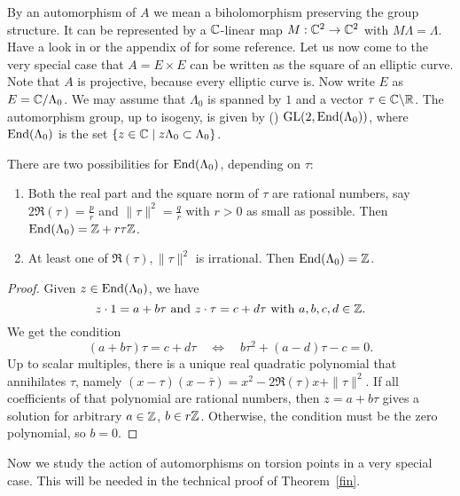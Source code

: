 By an automorphism of $A$ we mean a biholomorphism preserving the group structure. It can be represented by a $\mathbb{C}$-linear map $ M:\mathbb{C}^2 \rightarrow \mathbb{C}^2$ with $M\Lambda =\Lambda$. Have a look in \cite{Fujiki} or the appendix of \cite{Ghys} for some reference.
Let us now come to the very special case that $A=E\times E$ can be written as the square of an elliptic curve. Note that $A$ is projective, because every elliptic curve is. 
Now write $E$ as $E=\mathbb{C}/\Lambda_0$. We may assume that $\Lambda_0 $ is spanned by $1$ and a vector $\tau\in\mathbb{C}\backslash\mathbb{R}$. The automorphism group, up to isogeny, is given by (\cite{Ghys})
$\operatorname{GL}(2,\operatorname{End}(\Lambda_0))$, where
$\operatorname{End}(\Lambda_0)$ is the set $\{z\in\mathbb{C} \;|\; z\Lambda_0\subset \Lambda_0\}$.
\begin{proposition} \label{EndLambda}
There are two possibilities for $\operatorname{End}(\Lambda_0)$, depending on $\tau$:
\begin{enumerate}
 \item Both the real part and the square norm of $\tau$ are rational numbers, say $2\Re(\tau) = \frac{p}{r}$ and $\|\tau\|^2 = \frac{q}{r}$ with $r>0$ as small as possible. Then $\operatorname{End}(\Lambda_0)= \mathbb{Z}+ r\tau\mathbb{Z}$.
 \item At least one of $\Re(\tau), \|\tau\|^2$ is irrational. Then $\operatorname{End}(\Lambda_0)=\mathbb{Z}$.
\end{enumerate}
\end{proposition}
\begin{proof}
Given $z\in\operatorname{End}(\Lambda_0)$, we have $$z\cdot 1 = a + b\tau\text{ and }z\cdot \tau = c+ d\tau\text{ with }a,b,c,d\in \mathbb{Z}.$$ 
We get the condition
$$
(a+b\tau)\tau = c+d\tau\quad \Leftrightarrow \quad b\tau^2 + (a-d)\tau -c =0.
$$
Up to scalar multiples, there is a unique real quadratic polynomial that annihilates $\tau$, namely $ (x -\tau )(x-\bar{\tau})=x^2 - 2\Re(\tau)x+ \|\tau\|^2$. 
If all coefficients of that polynomial are rational numbers, then $z=a+b\tau$ gives a solution for arbitrary $a\in\mathbb{Z}$, $b\in r\mathbb{Z}$. Otherwise, the condition must be the zero polynomial, so $b=0$.
\end{proof}
Now we study the action of automorphisms on torsion points in a very special case. This will be needed in the technical proof of Theorem~\ref{fin}.
